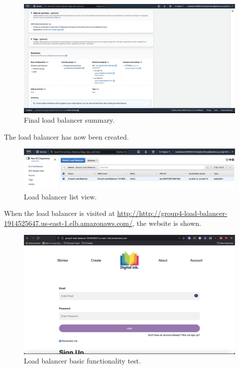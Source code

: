 \begin{figure}[!htbp]
	\centering
	\includegraphics[width=120mm]{resources/elb/elb-summary}
	\caption{Final load balancer summary.}
	\label{fig:elb-summary}
\end{figure}

\clearpage
The load balancer has now been created.

\begin{figure}[!htbp]
	\centering
	\includegraphics[width=\textwidth]{resources/elb/elb-created}
	\caption{Load balancer list view.}
	\label{fig:elb-created}
\end{figure}

When the load balancer is visited at
\href{http://http://group4-load-balancer-1914525647.us-east-1.elb.amazonaws.com/}{http://http://group4-load-balancer-1914525647.us-east-1.elb.amazonaws.com/},
the website is shown.

\begin{figure}[!htbp]
	\centering
	\includegraphics[width=\textwidth]{resources/elb/elb-working}
	\caption{Load balancer basic functionality test.}
	\label{fig:elb-working}
\end{figure}
